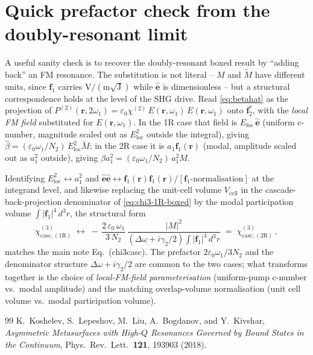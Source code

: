 \documentclass[11pt,a4paper]{article}
\newcommand{\eps}{\varepsilon}
\newcommand{\bvec}[1]{\mathbf{#1}}
\newcommand{\f}{\bvec{f}}
\newcommand{\ri}{\bvec{r}}
\newcommand{\dthreer}{\,d^{3}r}
\newcommand{\chitwo}{\chi^{(2)}}
\newcommand{\Dom}{\Delta\omega}
\newcommand{\chicascOneR}{\chi^{(3)}_{\text{casc},(1\mathrm R)}}
\newcommand{\chicascTwoR}{\chi^{(3)}_{\text{casc},(2\mathrm R)}}
\newcommand{\Vunit}{V_{\text{cell}}}
\begin{document}
\appendix
\section{Quick prefactor check from the doubly-resonant limit}\label{app:check}

A useful sanity check is to recover the doubly-resonant boxed result by
``adding back'' an FM resonance.  The substitution is not literal --
$M$ and $\widetilde M$ have different units, since $\f_1$ carries
$\mathrm{V}/(\mathrm{m}\sqrt{\mathrm J})$ while $\hat{\bm e}$ is
dimensionless -- but a structural correspondence holds at the level of
the SHG drive.  Read \eqref{eq:betahat} as the projection of
$P^{(2)}(\ri,2\omega_1)=\eps_0\chitwo\,E(\ri,\omega_1)\,E(\ri,\omega_1)$
onto $\f_2^{*}$, with the \emph{local FM field} substituted for
$E(\ri,\omega_1)$.  In the 1R case that field is $E_\text{loc}\,\hat{\bm e}$
(uniform c-number, magnitude scaled out as $E_\text{loc}^{2}$ outside the
integral), giving $\hat\beta=(\eps_0\omega_1/N_2)\,E_\text{loc}^{2}\widetilde M$;
in the 2R case it is $a_1\f_1(\ri)$ (modal, amplitude scaled out as
$a_1^{2}$ outside), giving $\beta a_1^{2}=(\eps_0\omega_1/N_2)\,a_1^{2}M$.

Identifying $E_\text{loc}^{2}\leftrightarrow a_1^{2}$ and
$\hat{\bm e}\hat{\bm e}\leftrightarrow\f_1(\ri)\f_1(\ri)/[\f_1\text{-normalisation}]$
at the integrand level, and likewise replacing the unit-cell volume
$\Vunit$ in the cascade-back-projection denominator of
\eqref{eq:chi3-1R-boxed} by the modal participation volume
$\int|\f_1|^{4}\dthreer$, the structural form
\begin{equation*}
  \chicascOneR\;\longleftrightarrow\;
   -\,\frac{2\,\eps_0\,\omega_1}{3\,N_2}\,
   \frac{|M|^{2}}{(\Dom+i\gamma_2/2)\!\int\!|\f_1|^{4}\dthreer}
   \;=\;\chicascTwoR\,,
\end{equation*}
matches the main note Eq.~(chi3casc).  The prefactor $2\eps_0\omega_1/3N_2$
and the denominator structure $\Dom+i\gamma_2/2$ are common to the two
cases; what transforms together is the choice of \emph{local-FM-field
parameterisation} (uniform-pump c-number vs.\ modal amplitude) and the
matching overlap-volume normalisation (unit cell volume vs.\ modal
participation volume).

\begin{thebibliography}{99}
K.~Koshelev, S.~Lepeshov, M.~Liu, A.~Bogdanov, and Y.~Kivshar,
\emph{Asymmetric Metasurfaces with High-$Q$ Resonances Governed by Bound
States in the Continuum},
Phys.\ Rev.\ Lett.\ \textbf{121}, 193903 (2018).
\end{thebibliography}
\end{document}
